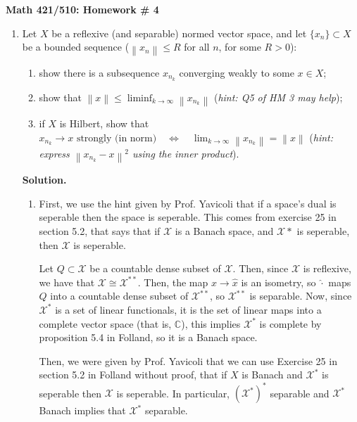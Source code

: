 \documentclass[11pt]{article}
\newcommand{\norm}[1]{\left\lVert #1 \right\rVert}
\begin{document}
\begin{center}
    {\Large \textbf{Math 421/510: Homework \# 4}}\\[0.5em]
\end{center}
\vspace{1em}

\begin{enumerate}[leftmargin=*, label=\arabic*.]

    \item Let $X$ be a reflexive (and separable) normed vector space, and let
    $\{x_n\} \subset X$ be a bounded sequence
    ($\norm{x_n} \le R$ for all $n$, for some $R > 0$):
    \begin{enumerate}[label=(\alph*)]
        \item show there is a subsequence $x_{n_k}$ converging weakly to some $x \in X$;
        \item show that $\norm{x} \le \liminf_{k \to \infty} \norm{x_{n_k}}$
        (\textit{hint: Q5 of HM 3 may help});
        \item if $X$ is Hilbert, show that $x_{n_k} \to x \text{ strongly (in norm)}
        \quad \Longleftrightarrow \quad
        \lim_{k \to \infty} \norm{x_{n_k}} = \norm{x}
        $
        (\textit{hint: express $\norm{x_{n_k}-x}^2$ using the inner product}).
    \end{enumerate}


\textbf{Solution.}
    \begin{enumerate}
        \item First, we use the hint given by Prof. Yavicoli that if a space's dual is seperable then the space is seperable.
            This comes from exercise 25 in section 5.2, that says that if $\mathcal{X}$ is a Banach space, and $\mathcal{X}*$ is seperable, then $\mathcal{X}$ is seperable.

            Let $Q \subset \mathcal{X}$  be a countable dense subset of $\mathcal{X}$.
            Then, since $\mathcal{X}$ is reflexive, we have that $\mathcal{X} \cong \mathcal{X}^{**}$.
            Then, the map $x \to \hat{x}$ is an isometry, so $\hat{\cdot}$ maps $Q$ into a countable dense subset of $\mathcal{X}^{**}$, so $\mathcal{X}^{**}$ is separable.
            Now, since $\mathcal{X}^{*}$ is a set of linear functionals, it is the set of linear maps into a complete vector space (that is, $\mathbb{C}$), this implies $\mathcal{X}^{*}$ is complete by proposition 5.4 in Folland, so it is a Banach space.

            Then, we were given by Prof. Yavicoli that we can use Exercise 25 in section 5.2 in Folland without proof, that if $X$ is Banach and $\mathcal{X}^{*}$ is seperable then $\mathcal{X}$ is seperable.
            In particular, $(\mathcal{X}^{*})^{*}$ separable and $\mathcal{X}^{*}$ Banach implies that $\mathcal{X}^{*}$ separable.


\end{enumerate}
\end{enumerate}
\end{document}
